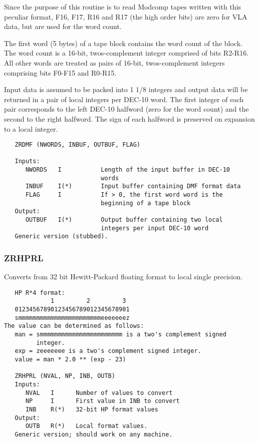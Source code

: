 Since the purpose of this routine is to read Modcomp tapes written
with this peculiar format, F16, F17, R16 and R17 (the high order
bits) are zero for VLA data, but are used for the word count.

The first word (5 bytes) of a tape block contains the word count of
the block.  The word count is a 16-bit, twos-complement integer
comprised of bits R2-R16.  All other words are treated as pairs of
16-bit, twos-complement integers comprising bits F0-F15 and R0-R15.

Input data is assumed to be packed into 1 1/8 integers and output
data will be returned in a pair of local integers per DEC-10 word.
The first integer of each pair corresponds to the left DEC-10
halfword (zero for the word count) and the second to the right
halfword.  The sign of each halfword is preserved on expansion to a
local integer.
\begin{verbatim}
   ZRDMF (NWORDS, INBUF, OUTBUF, FLAG)

   Inputs:
      NWORDS   I           Length of the input buffer in DEC-10
                           words
      INBUF    I(*)        Input buffer containing DMF format data
      FLAG     I           If > 0, the first word word is the
                           beginning of a tape block
   Output:
      OUTBUF   I(*)        Output buffer containing two local
                           integers per input DEC-10 word
   Generic version (stubbed).
\end{verbatim}

\subsubsection{ZRHPRL}
Converts from 32 bit Hewitt-Packard floating format to local single
precision.
\begin{verbatim}
   HP R*4 format:
             1         2         3
   01234567890123456789012345678901
   smmmmmmmmmmmmmmmmmmmmmmmeeeeeeez
The value can be determined as follows:
   man = smmmmmmmmmmmmmmmmmmmmmmm is a two's complement signed
         integer.
   exp = zeeeeeee is a two's complement signed integer.
   value = man * 2.0 ** (exp - 23)

   ZRHPRL (NVAL, NP, INB, OUTB)
   Inputs:
      NVAL   I      Number of values to convert
      NP     I      First value in INB to convert
      INB    R(*)   32-bit HP format values
   Output:
      OUTB   R(*)   Local format values.
   Generic version; should work on any machine.
\end{verbatim}

